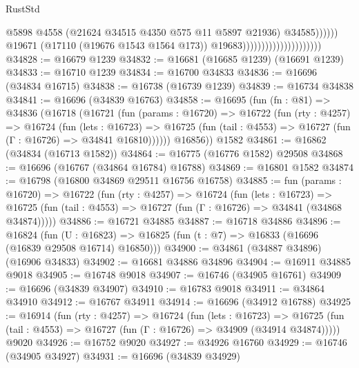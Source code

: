 \begin{lexlean}{RustStd}
\begin{coremodule}
                                                          @5898
                                                          @4558
                                                          (@21624
                                                            @34515
                                                            @4350
                                                            @575
                                                            @11
                                                            @5897
                                                            @21936)
                                                          @34585))))))
                                              @19671
                                              (@17110 (@19676 @1543 @1564 @173))
                                              @19683)))))))))))))))))))))
@34828 := @16679 @1239
@34832 := @16681 (@16685 @1239) (@16691 @1239)
@34833 := @16710 @1239
@34834 := @16700 @34833
@34836 := @16696 (@34834 @16715)
@34838 := @16738 (@16739 @1239)
@34839 := @16734 @34838
@34841 := @16696 (@34839 @16763)
@34858 := @16695
    (fun (fn : @81) =>
    @34836
      (@16718
        (@16721
          (fun (params : @16720) =>
          @16722
            (fun (rty : @4257) =>
            @16724
              (fun (lets : @16723) =>
              @16725 (fun (tail : @4553) => @16727 (fun (Γ : @16726) => @34841 @16810))))))
        @16856))
    @1582
@34861 := @16862 (@34834 (@16713 @1582))
@34864 := @16775 (@16776 @1582) @29508
@34868 := @16696 (@16767 (@34864 @16784) @16788)
@34869 := @16801 @1582
@34874 := @16798 (@16800 @34869 @29511 @16756 @16758)
@34885 := fun (params : @16720) =>
  @16722
    (fun (rty : @4257) =>
    @16724
      (fun (lets : @16723) =>
      @16725 (fun (tail : @4553) => @16727 (fun (Γ : @16726) => @34841 (@34868 @34874)))))
@34886 := @16721 @34885
@34887 := @16718 @34886
@34896 := @16824
    (fun (U : @16823) => @16825 (fun (t : @7) => @16833 (@16696 (@16839 @29508 @16714) @16850)))
@34900 := @34861 (@34887 @34896) (@16906 @34833)
@34902 := @16681 @34886 @34896
@34904 := @16911 @34885 @9018
@34905 := @16748 @9018
@34907 := @16746 (@34905 @16761)
@34909 := @16696 (@34839 @34907)
@34910 := @16783 @9018
@34911 := @34864 @34910
@34912 := @16767 @34911
@34914 := @16696 (@34912 @16788)
@34925 := @16914
    (fun (rty : @4257) =>
    @16724
      (fun (lets : @16723) =>
      @16725 (fun (tail : @4553) => @16727 (fun (Γ : @16726) => @34909 (@34914 @34874)))))
    @9020
@34926 := @16752 @9020
@34927 := @34926 @16760
@34929 := @16746 (@34905 @34927)
@34931 := @16696 (@34839 @34929)

\end{coremodule}
\end{lexlean}
